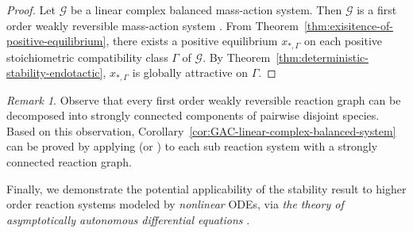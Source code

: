 \documentclass[10pt]{amsart}
\numberwithin{equation}{section}
\theoremstyle{plain}
\theoremstyle{definition}
\theoremstyle{remark}
\newtheorem{remark}[theorem]{Remark}
\newcommand{\cG}{\mathcal{G}}
\begin{document}
\begin{proof}
Let $\cG$ be a linear complex balanced mass-action system. Then $\cG$ is a first order weakly reversible mass-action system \cite[Theorem~3C]{H72}. From Theorem~\ref{thm:exisitence-of-positive-equilibrium}, there exists a positive equilibrium $x_{*,\Gamma}$ on each positive stoichiometric compatibility class $\Gamma$ of $\cG$. By Theorem~\ref{thm:deterministic-stability-endotactic}, $x_{*,\Gamma}$ is globally attractive on $\Gamma$.
\end{proof}
\begin{remark}
{Observe that every first order weakly reversible reaction graph can be decomposed into strongly connected components of pairwise disjoint species. Based on this observation, Corollary~\ref{cor:GAC-linear-complex-balanced-system} can be proved by applying \cite{A11b,A11a} (or \cite{GMS14}) to each sub reaction system with a strongly connected reaction graph.}
\end{remark}
Finally, we demonstrate the potential applicability of the stability result to higher order reaction systems modeled by \emph{nonlinear} ODEs,  via \emph{the theory of asymptotically autonomous differential equations} \cite{T92}.
\end{document}
